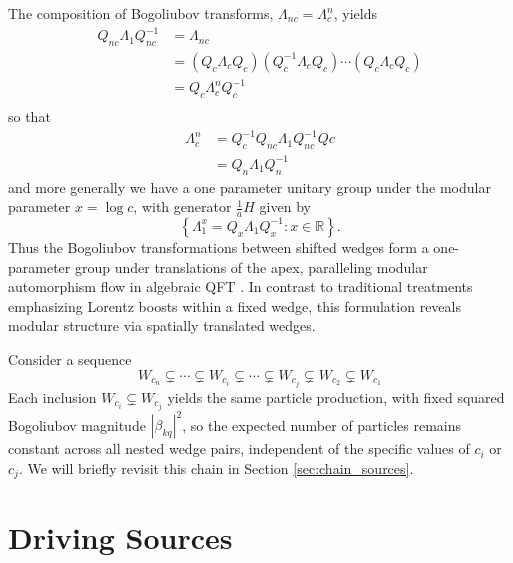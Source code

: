 \documentclass[12pt,a4paper]{article}
\begin{document}
The composition of Bogoliubov transforms, $\Lambda_{nc} = \Lambda_c^n$, yields
\begin{equation}
  \begin{array}{ll}    
    Q_{nc} \Lambda_1 Q_{nc}^{-1}  &= \Lambda_{nc} \\
         &= \left(Q_c \Lambda_{c} Q_c\right) \left( Q_c^{-1} \Lambda_{c} Q_c\right) \cdots \left(Q_c \Lambda_{c} Q_c\right) \\
  &= Q_c \Lambda_c^n Q_c^{-1} \\
  \end{array}
\end{equation}
so that
\begin{equation}
  \begin{array}{ll}
  \Lambda_c^n &= Q_c^{-1} Q_{nc} \Lambda_1 Q_{nc}^{-1} Q{c} \\
  &= Q_n \Lambda_1 Q_n^{-1}
  \end{array}
\end{equation}
and more generally we have a one parameter unitary group under the modular parameter $x = \log c$, with generator $\frac{1}{a} H$ given by
\begin{equation}
  \left\{\Lambda_1^x = Q_x \Lambda_1 Q_x^{-1} : x \in \mathbb{R} \right\}.
\end{equation}
Thus the Bogoliubov transformations between shifted wedges form a one-parameter group under translations of the apex, paralleling modular automorphism flow in algebraic QFT \cite{borchers2000revolutionizing}. In contrast to traditional treatments emphasizing Lorentz boosts within a fixed wedge, this formulation reveals modular structure via spatially translated wedges.

Consider a sequence
\begin{equation}
  W_{c_n} \subsetneq \cdots \subsetneq W_{c_i} \subsetneq \cdots \subsetneq W_{c_j} \subsetneq W_{c_2} \subsetneq W_{c_1}
  \label{chain}
\end{equation}
Each inclusion $W_{c_i} \subsetneq W_{c_j}$ yields the same particle production, with fixed squared Bogoliubov magnitude $|\beta_{kq}|^2$, so the expected number of particles remains constant across all nested wedge pairs, independent of the specific values of $c_i$ or $c_j$. We will briefly revisit this chain in Section \ref{sec:chain_sources}.

\section{Driving Sources} \label{sec:drive}
\end{document}
